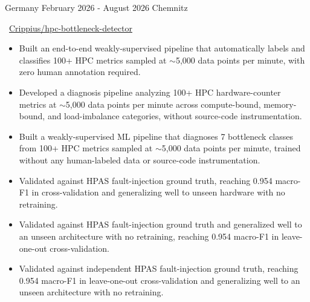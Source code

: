 {Germany}
{February 2026 - August 2026}
{Chemnitz}
{\footnotesize\faCode \hspace{1pt}
}

{\small \faGithub~\href{https://github.com/Crippius/hpc-bottleneck-detector}{Crippius/hpc-bottleneck-detector}}

\smallskip
\begin{itemize}

    \ifde
        \item Built an end-to-end weakly-supervised pipeline that automatically labels and classifies 100+ HPC metrics sampled at $\sim$5,000 data points per minute, with zero human annotation required.
    \else
        \ifhpc
            \item Developed a diagnosis pipeline analyzing 100+ HPC hardware-counter metrics at $\sim$5,000 data points per minute across compute-bound, memory-bound, and load-imbalance categories, without source-code instrumentation.
        \else
            \item Built a weakly-supervised ML pipeline that diagnoses 7 bottleneck classes from 100+ HPC metrics sampled at $\sim$5,000 data points per minute, trained without any human-labeled data or source-code instrumentation.
        \fi
    \fi

    \ifde
        \item Validated against HPAS fault-injection ground truth, reaching 0.954 macro-F1 in cross-validation and generalizing well to unseen hardware with no retraining.
    \else
        \ifhpc
            \item Validated against HPAS fault-injection ground truth and generalized well to an unseen architecture with no retraining, reaching 0.954 macro-F1 in leave-one-out cross-validation.
        \else
            \item Validated against independent HPAS fault-injection ground truth, reaching 0.954 macro-F1 in leave-one-out cross-validation and generalizing well to an unseen architecture with no retraining.
        \fi
    \fi

\end{itemize}

\medskip
